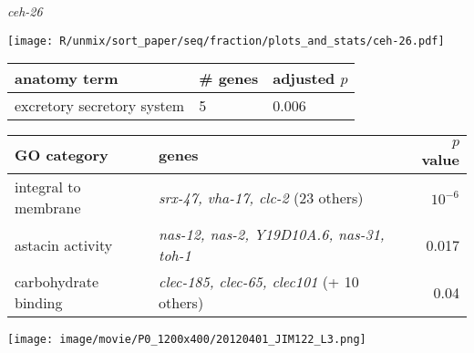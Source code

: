 \documentclass[serif,9pt]{beamer}
\begin{document}
\begin{frame}{{\em ceh-26}}

\begin{minipage}{0.4\textwidth}
\texttt{[image: R/unmix/sort\_paper/seq/fraction/plots\_and\_stats/ceh-26.pdf]}
\end{minipage}
\begin{minipage}{0.58\textwidth}
\begin{table}[!tbp]\scriptsize
\begin{tabular}{lll}
anatomy term & \# genes & adjusted $p$ \\
\hline
excretory secretory system & 5 & 0.006 \\
\end{tabular}
\end{table}
\end{minipage}

\begin{table}\footnotesize
\begin{tabular}{llr}
GO category & genes & $p$ value \\
\hline
integral to membrane & {\em srx-47, vha-17, clc-2} (23 others) & $10^{-6}$ \\
astacin activity & {\em nas-12, nas-2, Y19D10A.6, nas-31, toh-1} & 0.017 \\
carbohydrate binding & {\em clec-185, clec-65, clec101} (+ 10 others) & 0.04 \\
\end{tabular}
\end{table}

\texttt{[image: image/movie/P0\_1200x400/20120401\_JIM122\_L3.png]}

\end{frame}
\end{document}

